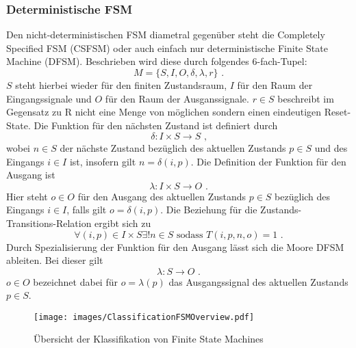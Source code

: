 \subsubsection{Deterministische FSM}
\label{subsubsec:ClassDFSM}
Den nicht-deterministischen FSM diametral gegenüber steht die Completely Specified FSM (CSFSM) oder auch einfach nur deterministische Finite State Machine (DFSM). Beschrieben wird diese durch folgendes 6-fach-Tupel:
\begin{equation}
M = \{S,I,O,\delta,\lambda,r\} \text{ .}
\label{eq:DefDFSM}
\end{equation}
$S$ steht hierbei wieder für den finiten Zustandsraum, $I$ für den Raum der Eingangssignale und $O$ für den Raum der Ausganssignale. $r \in S$ beschreibt im Gegensatz zu R nicht eine Menge von möglichen sondern einen eindeutigen Reset-State. Die Funktion für den nächsten Zustand ist definiert durch
\begin{equation}
\delta : I \times S \xrightarrow{} S \text{ ,}
\label{eq:DefDFSMdelta}
\end{equation}
wobei $n \in S$ der nächste Zustand bezüglich des aktuellen Zustands $p \in S$ und des Eingangs $i \in I$ ist, insofern gilt $n = \delta(i,p)$. Die Definition der Funktion für den Ausgang ist
\begin{equation}
\lambda : I \times S \xrightarrow{} O \text{ .}
\label{eq:DefDFSMlambda}
\end{equation}
Hier steht $o \in O$ für den Ausgang des aktuellen Zustands $p \in S$ bezüglich des Eingangs $i \in I$, falls gilt $o = \delta(i,p)$. Die Beziehung für die Zustands-Transitions-Relation ergibt sich zu
\begin{equation}
\forall (i,p) \in I \times S \exists! n \in S \text{ sodass } T(i,p,n,o)=1 \text{ .}
\end{equation}
Durch Spezialisierung der Funktion für den Ausgang lässt sich die Moore DFSM ableiten. Bei dieser gilt
\begin{equation}
\lambda : S \xrightarrow{} O \text{ .}
\label{eq:DefMooreDFSMlambda}
\end{equation}
$o \in O$ bezeichnet dabei für $o=\lambda(p)$ das Ausgangssignal des aktuellen Zustands $p \in S$.
\begin{figure}
	\centering
	\texttt{[image: images/ClassificationFSMOverview.pdf]}
	\caption{Übersicht der Klassifikation von Finite State Machines}
	\label{img:ClassFSM}
\end{figure}

